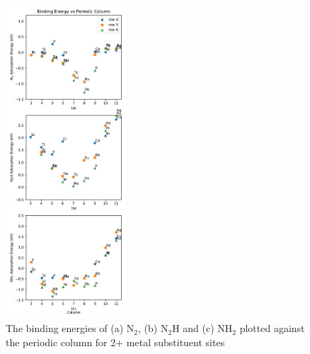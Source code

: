 \begin{figure}
    \centering
    \includegraphics[width=0.4\textwidth]{Images/adsorption_rows.pdf}
    \caption{The binding energies of (a) N$_2$, (b) N$_2$H and (c) NH$_2$ plotted against the periodic column for 2+ metal substituent sites}
    \label{fig:column_trends}
\end{figure}

